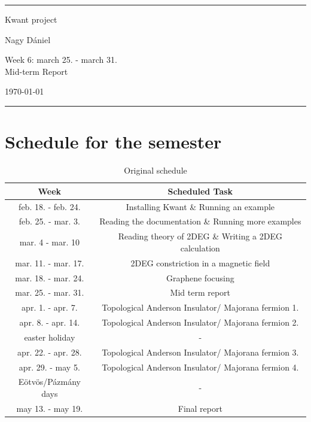 \documentclass[12pt]{article}
\numberwithin{equation}{section}
\begin{document}
\begin{center}

\thispagestyle{empty}

\rule{10 cm}{2pt}

\vspace{1.5cm}
{ \Large Kwant project}

\vspace{1.0cm}
Nagy Dániel

\vspace{0.5cm}
Week 6: march 25. - march 31. \\
Mid-term Report

\vspace{0.5cm}
\today

\vspace{0.25cm}
\rule{10 cm}{2pt}

\end{center}
\newpage

\newpage
{}

\section{Schedule for the semester}
\begin{table}[ht]
  \centering
  \caption{Original schedule}
  \begin{tabular}{|c|c|}
  \hline
  Week & Scheduled Task \\ [0.5ex]  \hline %
  feb. 18. - feb. 24. & Installing Kwant \& Running an example \\ \hline
  feb. 25. - mar. 3. & Reading the documentation \& Running more examples \\ \hline
  mar. 4 - mar. 10 & Reading theory of 2DEG \& Writing a 2DEG calculation \\ \hline 
  mar. 11. - mar. 17. & 2DEG constriction in a magnetic field \\ \hline
  mar. 18. -  mar. 24. & Graphene focusing \\ \hline
  mar. 25. -  mar. 31. & Mid term report \\ \hline
  apr. 1. -  apr. 7. & Topological Anderson Insulator/ Majorana fermion 1. \\ \hline
  apr. 8. -  apr. 14. & Topological Anderson Insulator/ Majorana fermion 2. \\ \hline
  easter holiday & - \\ \hline
  apr. 22. - apr. 28. & Topological Anderson Insulator/ Majorana fermion 3. \\ \hline 
  apr. 29. - may 5. & Topological Anderson Insulator/ Majorana fermion 4. \\ \hline 
  Eötvös/Pázmány days & - \\ \hline
  may 13. - may 19. & Final report \\ \hline

  \end{tabular}
\end{table}
\end{document}
